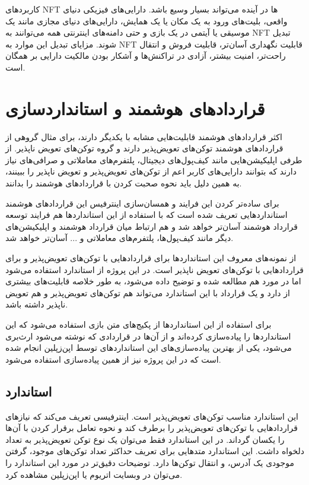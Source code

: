 کاربردهای NFT ها در آینده می‌تواند بسیار وسیع باشد. دارایی‌های فیزیکی دنیای واقعی، بلیت‌های ورود به یک مکان یا یک همایش، دارایی‌های دنیای مجازی مانند یک موسیقی یا آیتمی در یک بازی و حتی دامنه‌های اینترنتی همه می‌توانند به NFT تبدیل شوند. مزایای تبدیل این موارد به NFT قابلیت نگهداری آسان‌تر، قابلیت فروش و انتقال راحت‌تر، امنیت بیشتر، آزادی در تراکنش‌ها و آشکار بودن مالکیت دارایی بر همگان است.


\section{قرارداد‌های هوشمند و استانداردسازی}
اکثر قرارداد‌های هوشمند قابلیت‌هایی مشابه با یکدیگر دارند، برای مثال گروهی از قرارداد‌های هوشمند توکن‌های تعویض‌پذیر دارند و گروه توکن‌های تعویض ناپذیر. از طرفی اپلیکیشن‌هایی مانند کیف‌پول‌های دیجیتال، پلتفرم‌های معاملاتی و صرافی‌های نیاز دارند که بتوانند دارایی‌های کاربر اعم از توکن‌های تعویض‌پذیر و تعویض ناپذیر را ببینند، به همین دلیل باید نحوه صحبت کردن با قراردادهای هوشمند را بدانند.

برای ساده‌تر کردن این فرایند و همسان‌سازی اینترفیس  این قراردادهای هوشمند استانداردهایی تعریف شده است که با استفاده از این استانداردها هم فرایند توسعه قرارداد هوشمند آسان‌تر خواهد شد و هم ارتباط میان قرارداد هوشمند و اپلیکیشن‌های دیگر مانند کیف‌پول‌ها، پلتفرم‌های معاملاتی و ... آسان‌تر خواهد شد.

از نمونه‌های معروف این استانداردها
برای قرارداد‌هایی با توکن‌های تعویض‌پذیر و
برای قراردادهایی با توکن‌های تعویض ناپذیر است. در این پروژه از استاندارد
استفاده می‌شود اما در مورد
هم مطالعه شده و توضیح داده می‌شود، به طور خلاصه
قابلیت‌های بیشتری از
دارد و یک قرارداد با این استاندارد می‌تواند هم توکن‌های تعویض‌پذیر و هم تعویض ناپذیر داشته باشد.

برای استفاده از این استاندارد‌ها از پکیج‌های متن بازی استفاده می‌شود که این استاندارد‌ها را پیاده‌سازی کرده‌اند و از آن‌ها در قراردادی که نوشته می‌شود ارث‌بری می‌شود، یکی از بهترین پیاده‌سازی‌های این استاندارد‌های توسط اپن‌زپلین انجام شده است که در این پروژه نیز از همین پیاده‌سازی استفاده می‌شود.

\subsection{استاندارد }
این استاندارد مناسب توکن‌های تعویض‌پذیر است. اینترفیسی تعریف می‌کند که نیازهای قراردادهایی با توکن‌های تعویض‌پذیر را برطرف کند و نحوه تعامل برقرار کردن با آن‌ها را یکسان گرداند. در این استاندارد فقط می‌توان یک نوع توکن تعویض‌پذیر به تعداد دلخواه داشت. این استاندارد متدهایی برای تعریف حداکثر تعداد توکن‌های موجود، گرفتن موجودی یک آدرس، و انتقال توکن‌ها دارد. توضیحات دقیق‌تر در مورد این استاندارد را می‌توان در وبسایت
اتریوم
یا اپن‌زپلین
مشاهده کرد.

